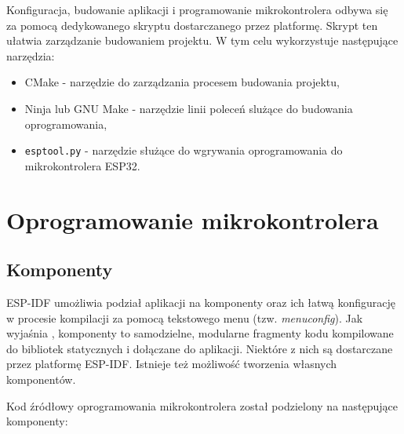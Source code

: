         Konfiguracja, budowanie aplikacji i programowanie mikrokontrolera odbywa się za pomocą dedykowanego skryptu dostarczanego przez platformę. Skrypt ten ułatwia zarządzanie budowaniem projektu. W tym celu wykorzystuje następujące narzędzia:

        \begin{itemize}
            \item CMake - narzędzie do zarządzania procesem budowania projektu,
            \item Ninja lub GNU Make -  narzędzie linii poleceń slużące do budowania oprogramowania,
            \item \texttt{esptool.py} - narzędzie służące do wgrywania oprogramowania do mikrokontrolera ESP32.
        \end{itemize}

    \section{Oprogramowanie mikrokontrolera}

        \subsection{Komponenty}

            ESP-IDF umożliwia podział aplikacji na komponenty oraz ich łatwą konfigurację w procesie kompilacji za pomocą tekstowego menu (tzw. \textit{menuconfig}). Jak wyjaśnia \cite{esp-idf-build-system}, komponenty to samodzielne, modularne fragmenty kodu kompilowane do bibliotek statycznych i dołączane do aplikacji. Niektóre z nich są dostarczane przez platformę ESP-IDF. Istnieje też możliwość tworzenia własnych komponentów.

            Kod źródłowy oprogramowania mikrokontrolera został podzielony na następujące komponenty:

